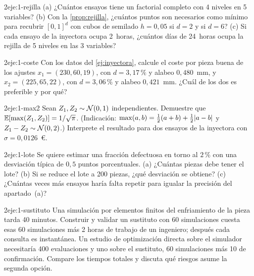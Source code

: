 \begin{ejercicio}{2}{eje:1-rejilla}
(a) ¿Cuántos ensayos tiene un factorial completo con 4 niveles en 5 variables? (b) Con la \cref{prop:rejilla}, ¿cuántos puntos son necesarios como mínimo para recubrir $[0,1]^{d}$ con cubos de semilado $h=0{,}05$ si $d=2$ y si $d=6$? (c) Si cada ensayo de la inyectora ocupa 2~horas, ¿cuántos días de 24~horas ocupa la rejilla de 5 niveles en las 3 variables?
\end{ejercicio}

\begin{ejercicio}{2}{eje:1-coste}
Con los datos del \cref{ej:inyectora}, calcule el coste por pieza buena de los ajustes $x_1=(230,60,19)$, con $d=3{,}17\,\%$ y alabeo $0{,}480$~mm, y $x_2=(225,65,22)$, con $d=3{,}06\,\%$ y alabeo $0{,}421$~mm. ¿Cuál de los dos es preferible y por qué?
\end{ejercicio}

\begin{ejercicio}{2}{eje:1-max2}
Sean $Z_1,Z_2\sim\mathcal{N}(0,1)$ independientes. Demuestre que $\mathbb{E}[\max(Z_1,Z_2)]=1/\sqrt\pi$. (Indicación: $\max(a,b)=\tfrac12(a+b)+\tfrac12\lvert a-b\rvert$ y $Z_1-Z_2\sim\mathcal{N}(0,2)$.) Interprete el resultado para dos ensayos de la inyectora con $\sigma=0{,}0126$~€.
\end{ejercicio}

\begin{ejercicio}{2}{eje:1-lote}
Se quiere estimar una fracción defectuosa en torno al $2\,\%$ con una desviación típica de $0{,}5$ puntos porcentuales. (a) ¿Cuántas piezas debe tener el lote? (b) Si se reduce el lote a 200 piezas, ¿qué desviación se obtiene? (c) ¿Cuántas veces más ensayos haría falta repetir para igualar la precisión del apartado~(a)?
\end{ejercicio}

\begin{ejercicio}{2}{eje:1-sustituto}
Una simulación por elementos finitos del enfriamiento de la pieza tarda 40 minutos. Construir y validar un sustituto con 60 simulaciones cuesta esas 60 simulaciones más 2 horas de trabajo de un ingeniero; después cada consulta es instantánea. Un estudio de optimización directa sobre el simulador necesitaría 400 evaluaciones y uno sobre el sustituto, 60 simulaciones más 10 de confirmación. Compare los tiempos totales y discuta qué riesgos asume la segunda opción.
\end{ejercicio}

